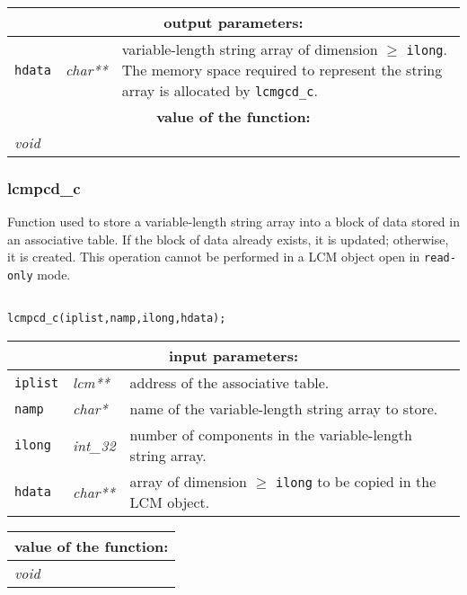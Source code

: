\vskip 0.8cm

\noindent
\begin{tabular}{|p{1.5cm}|p{2cm}|p{11cm}|}
\hline
\multicolumn{3}{|c|}{\bf output parameters:} \\
\hline
{\tt hdata} & {\it char**} & variable-length string array of dimension $\ge$ {\tt ilong}. The memory space required to represent the string array is allocated by {\tt lcmgcd\_c}.\\
\hline
\multicolumn{3}{|c|}{\bf value of the function:} \\
\hline
\multicolumn{2}{|l|}{\it void} &  \\
\hline
\end{tabular}

\subsubsection{lcmpcd\_c}\label{sect:lcmpcdc}

Function used to store a variable-length string array into a block of data stored in an associative table.
If the block of data already exists, it is updated; otherwise, it is created. This operation cannot be performed
in a LCM object open in {\tt read-only} mode.

\begin{verbatim}

lcmpcd_c(iplist,namp,ilong,hdata);
\end{verbatim}

\noindent
\begin{tabular}{|p{1.5cm}|p{2cm}|p{11cm}|}
\hline
\multicolumn{3}{|c|}{\bf input parameters:} \\
\hline
{\tt iplist} & {\it lcm**} & address of the associative table. \\
\hline
{\tt namp} & {\it char*} &name of the variable-length string array
to store. \\
\hline
{\tt ilong} & {\it int\_32} & number of components in the variable-length string array.\\
\hline
{\tt hdata} & {\it char**} & array of dimension $\ge$ {\tt ilong} to be copied in the LCM object. \\
\hline
\end{tabular}

\vskip 0.8cm

\noindent
\begin{tabular}{|p{4.0cm}|p{11cm}|}
\hline
\multicolumn{2}{|c|}{\bf value of the function:} \\
\hline
{\it void} &  \\
\hline
\end{tabular}


